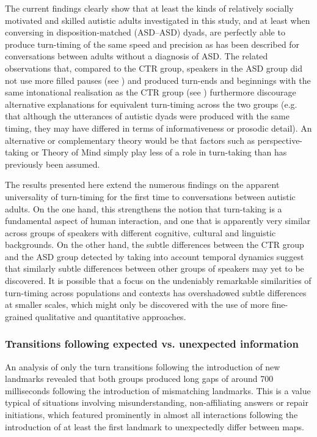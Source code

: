 The current findings clearly show that at least the kinds of relatively socially motivated and skilled autistic adults investigated in this study, and at least when conversing in disposition-matched (ASD--ASD) dyads, are perfectly able to produce turn-timing of the same speed and precision as has been described for conversations between adults without a diagnosis of ASD. The related observations that, compared to the CTR group, speakers in the ASD group did not use more filled pauses (see ) and produced turn-ends and beginnings with the same intonational realisation as the CTR group (see ) furthermore discourage alternative explanations for equivalent turn-timing across the two groups (e.g. that although the utterances of autistic dyads were produced with the same timing, they may have differed in terms of informativeness or prosodic detail). An alternative or complementary theory would be that factors such as perspective-taking or Theory of Mind simply play less of a role in turn-taking \citep[and perhaps even ASD in general; see][]{williamsTheoryAutisticMind2021} than has previously been assumed.

The results presented here extend the numerous findings on the apparent universality of turn-timing for the first time to conversations between autistic adults. On the one hand, this strengthens the notion that turn-taking is a fundamental aspect of human interaction, and one that is apparently very similar across groups of speakers with different cognitive, cultural and linguistic backgrounds. On the other hand, the subtle differences between the CTR group and the ASD group detected by taking into account temporal dynamics suggest that similarly subtle differences between other groups of speakers may yet to be discovered. It is possible that a focus on the undeniably remarkable similarities of turn-timing across populations and contexts has overshadowed subtle differences at smaller scales, which might only be discovered with the use of more fine-grained qualitative and quantitative approaches.

\subsubsection{Transitions following expected vs. unexpected information}\label{turntaking_conclusion_discussion_mismatches}


An analysis of only the turn transitions following the introduction of new landmarks revealed that both groups produced long gaps of around 700 milliseconds following the introduction of mismatching landmarks. This is a value typical of situations involving misunderstanding, non-affiliating answers or repair initiations, which featured prominently in almost all interactions following the introduction of at least the first landmark to unexpectedly differ between maps.

